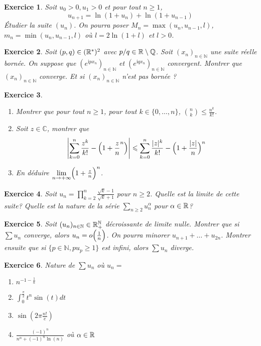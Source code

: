 \documentclass[12pt]{article}
\newtheorem{exercise}{Exercice}[section]
\theoremstyle{remark}
\theoremstyle{remark}
\newcommand{\C}{\mathbb{C}} \newcommand{\Q}{\mathbb{Q}}
\newcommand{\N}{\mathbb{N}} \newcommand{\Z}{\mathbb{Z}}
\begin{document}
\begin{exercise}
	Soit $u_0>0,u_1>0$ et pour tout $n\geqslant 1$,
	$$u_{n+1}=\ln(1+u_{n})+\ln(1+u_{n-1})$$ Étudier la suite $(u_{n})$. On pourra
	poser $M_{n}=\max(u_{n},u_{n-1},l)$, $m_{n}=\min(u_{n},u_{n-1},l)$ où
	$l=2\ln(1+l)$ et $l>0$.
\end{exercise}

\begin{exercise}
	Soit $(p,q)\in(\mathbb{R}^{*})^{2}$ avec $p/q\in\R\setminus\Q$. Soit
	$(x_{n})_{n\in\N}$ une suite réelle bornée. On suppose que
	$(e^{\mathrm{i}px_{n}})_{n\in\N}$ et $(e^{\mathrm{i}qx_{n}})_{n\in\N}$
	convergent. Montrer que $(x_{n})_{n\in\N}$ converge. Et si $(x_{n})_{n\in\N}$
	n'est pas bornée ?
\end{exercise}

\begin{exercise}
	\phantom{}
	\begin{enumerate}
		\item
		Montrer que pour tout $n\geqslant1$, pour tout $k\in\{0,\dots,n\}$,
		$\binom{n}{k}\leqslant\frac{n^{k}}{k!}$.
		\item
		Soit $z\in\C$, montrer que 
		$$\Biggl\vert\sum_{k=0}^{n}\frac{z^{k}}{k!}-\Bigl(1+\frac{z}{n}^{n}\Bigr)\Biggr\vert\leqslant\sum_{k=0}^{n}\frac{\vert
		z\vert^{k}}{k!}-\Bigl(1+\frac{\vert z\vert}{n}\Bigr)^{n}$$
		\item
		En déduire $\lim\limits_{n\to+\infty}\Bigl(1+\frac{z}{n}\Bigr)^{n}$.
	\end{enumerate}
\end{exercise}

\begin{exercise}
	Soit $u_{n}=\prod_{k=2}^{n}\frac{\sqrt{k}-1}{\sqrt{k}+1}$ pour $n\geqslant 2$.
	Quelle est la limite de cette suite? Quelle est la nature de la série
	$\sum_{n\geqslant 2}u_{n}^{\alpha}$ pour $\alpha\in\mathbb{R}$?
\end{exercise}

\begin{exercise}
	Soit $(u_{n})_{n\in\N}\in\R_{+}^{\N}$ décroissante de limite nulle. Montrer
	que si $\sum u_{n}$ converge, alors $u_{n}=o\Bigl(\frac{1}{n}\Bigr)$. On
	pourra minorer $u_{n+1}+\dots+u_{2n}$. Montrer ensuite que si $\{p\in\N,
	pu_{p}\geqslant1\}$ est infini, alors $\sum u_{n}$ diverge.
\end{exercise}

\begin{exercise}
	Nature de $\sum u_{n}$ où $u_{n}=$
	\begin{enumerate}
		\item
		$n^{-1-\frac{1}{n}}$
		\item
		$\int_{0}^{\frac{\pi}{2}}t^{n}\sin(t)dt$
		\item
		$\sin(2\pi\frac{n!}{e})$
		\item
		$\frac{(-1)^{n}}{n^{\alpha}+(-1)^{n}\ln(n)}$ où $\alpha\in\mathbb{R}$
	\end{enumerate}
\end{exercise}
\end{document}
